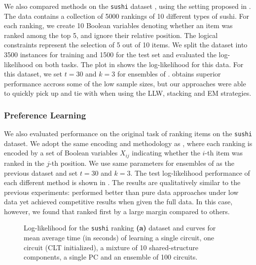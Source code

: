 We also compared methods on the \texttt{sushi} dataset \citep{kamishima03}, using the setting
proposed in \citet{shen17}. The data contains a collection of \num{5000} rankings of \num{10}
different types of sushi. For each ranking, we create \num{10} Boolean variables denoting whether
an item was ranked among the top 5, and ignore their relative position. The logical constraints
represent the selection of \num{5} out of \num{10} items. We split the dataset into \num{3500}
instances for training and \num{1500} for the test set and evaluated the log-likelihood on both
tasks. The plot in  shows the log-likelihood for this data. For this
dataset, we set $t=30$ and $k=3$ for ensembles of . 
obtains superior performance accross some of the low sample sizes, but our approaches were able to
quickly pick up and tie with  when using the LLW, stacking and EM strategies.

\subsubsection{Preference Learning}

We also evaluated performance on the original task of ranking items on the \texttt{sushi} dataset.
We adopt the same encoding and methodology as \citep{choi15}, where each ranking is encoded by a
set of Boolean variables $X_{ij}$ indicating whether the $i$-th item was ranked in the $j$-th
position. We use same parameters for ensembles of  as the previous dataset and
set $t=30$ and $k=3$. The test log-likelihood performance of each different method is shown in
. The results are qualitatively similar to the previous experiments:
 performed better than pure data approaches under low data yet achieved
competitive results when given the full data. In this case, however, we found that
 ranked first by a large margin compared to others.

\begin{figure}[t]
  \begin{subfigure}{0.495\textwidth}
    \caption{}
    \label{fig:ll-sushi-ranking}
  \end{subfigure}
  \begin{subfigure}{0.495\textwidth}
    \caption{}
    \label{fig:sushi-time}
  \end{subfigure}
  \caption{Log-likelihood for the \texttt{sushi} ranking \textbf{(a)} dataset and curves for mean
  average time (in seconds) of learning a single  circuit, one
   circuit (CLT initialized), a mixture of 10 shared-structure 
  components, a single  PC and an ensemble of 100 
  circuits.}
  \label{fig:ll-preference}
\end{figure}

